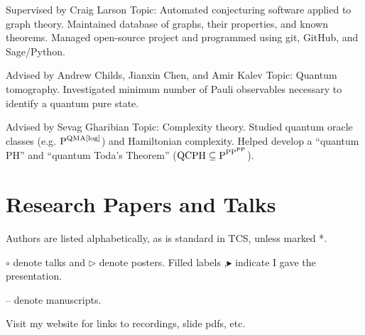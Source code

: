 \documentclass[11pt,letterpaper,serif]{moderncv}
\begin{document}
{
	\begin{adjustwidth}{.25in}{}
		Supervised by Craig Larson \newline
		Topic: Automated conjecturing software applied to graph theory.\newline
		Maintained database of graphs, their properties, and known theorems. Managed open-source project and programmed using git, GitHub, and Sage/Python.
	\end{adjustwidth}
}

{}{}{}
{
	\begin{adjustwidth}{.25in}{}
		Advised by Andrew Childs, Jianxin Chen, and Amir Kalev \newline
		Topic: Quantum tomography. Investigated minimum number of Pauli observables necessary to identify a quantum pure state.
	\end{adjustwidth}
}

{
	\begin{adjustwidth}{.25in}{}
		Advised by Sevag Gharibian \newline
		Topic: Complexity theory. Studied quantum oracle classes  (e.g. {\scriptsize $\textup{P}^{\textup{QMA[log]}}$}) and Hamiltonian complexity. Helped develop a ``quantum PH'' and ``quantum Toda's Theorem'' ({\scriptsize $\textup{QCPH}\subseteq \textup{P}^{\textup{PP}^{\textup{PP}}}$}).
	\end{adjustwidth}
}

\section{Research Papers and Talks}
\vspace{-.1in}
{\footnotesize
	Authors are listed alphabetically, as is standard in TCS, unless marked *.

	$\circ$ denote talks and $\triangleright$ denote posters. Filled labels \textbullet{},$\blacktriangleright$ indicate I gave the presentation.

	-- denote manuscripts.

	Visit my website for links to recordings, slide pdfs, etc.

	~
}
\end{document}
